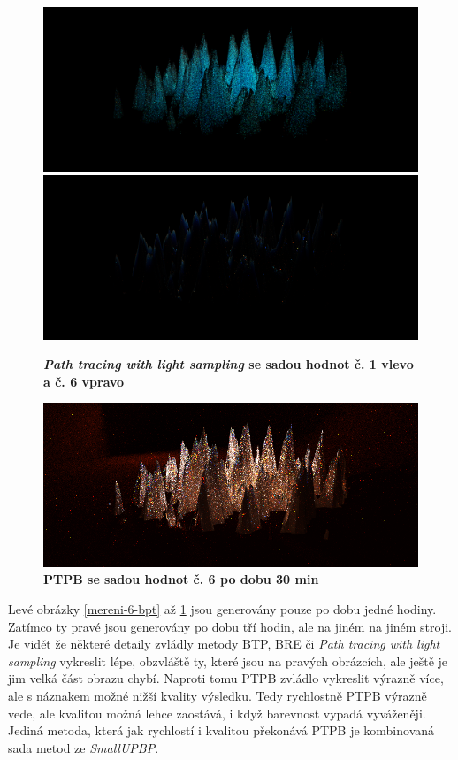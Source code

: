 \begin{figure}[H]\centering
\includegraphics[width=0.5\linewidth]{obrazky-figures/vysledky_upbp_pb2d_3600.png}\hfill
\includegraphics[width=0.5\linewidth]{obrazky-figures/vysledky-pb2d-6-3h.png}
\hfill
  \caption{\textbf{\textit{Path tracing with light sampling} se sadou hodnot č. 1 vlevo a č. 6  vpravo}}
  \label{mereni-6-ptls}
\end{figure}
\begin{figure}[H]\centering
\includegraphics[width=1\linewidth]{obrazky-figures/PTPB_1800.png}\hfill
  \caption{\textbf{PTPB se sadou hodnot č. 6 po dobu 30 min}}
  \label{mereni-6-ptpb}
\end{figure}

Levé obrázky \ref{mereni-6-bpt} až \ref{mereni-6-ptls} jsou generovány pouze po dobu jedné hodiny. Zatímco ty pravé jsou generovány po dobu tří hodin, ale na jiném na jiném stroji. Je vidět že některé detaily zvládly metody BTP, BRE či \textit{Path tracing with light sampling} vykreslit lépe, obzvláště ty, které jsou na pravých obrázcích, ale ještě je jim velká část obrazu chybí. Naproti tomu PTPB zvládlo vykreslit výrazně více, ale s náznakem možné nižší kvality výsledku. Tedy rychlostně PTPB výrazně vede, ale kvalitou možná lehce zaostává, i když  barevnost vypadá vyváženěji.  Jediná metoda, která jak rychlostí i kvalitou překonává PTPB je kombinovaná sada metod ze \textit{SmallUPBP}.
\newpage
